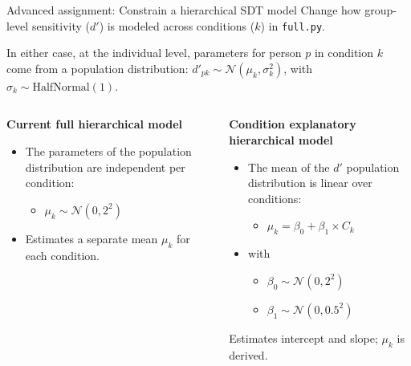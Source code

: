 \documentclass[aspectratio=169]{beamer}
\begin{document}
\begin{frame}[fragile]{Advanced assignment: Constrain a hierarchical SDT model}
    Change how group-level sensitivity ($d'$) is modeled across conditions ($k$) in \texttt{full.py}.
    
    In either case, at the individual level, parameters for person $p$ in condition $k$ come from a population distribution: $d'_{pk} \sim \mathcal{N}(\mu_{k}, \sigma_{k}^2)$, with $\sigma_{k} \sim \text{HalfNormal}(1)$.\\[3ex]

    \begin{columns}[T] %
        \begin{column}{0.5\textwidth}
            \textbf{Current full hierarchical model} \\
            \begin{itemize}
            \item The parameters of the population distribution are independent per condition:
            \begin{itemize}
                \item $\mu_{k} \sim \mathcal{N}(0, 2^2)$
            \end{itemize}
            \item Estimates a separate mean $\mu_{k}$ for each condition.
            \end{itemize}
        \end{column}

        \begin{column}{0.55\textwidth}
            \textbf{Condition explanatory hierarchical model} \\
            \begin{itemize}
            \item The mean of the $d'$ population distribution is linear over conditions:
            \begin{itemize}
                \item $\mu_{k} = \beta_0 + \beta_1 \times C_k$
            \end{itemize}
            \item[] with
                \begin{itemize}
                    \item $\beta_0 \sim \mathcal{N}(0, 2^2)$
                    \item $\beta_1 \sim \mathcal{N}(0, 0.5^2)$
                \end{itemize}
            \end{itemize}
            Estimates intercept and slope; $\mu_{k}$ is derived.
        \end{column}
    \end{columns}
\end{frame}

\maketitle
\end{document}
